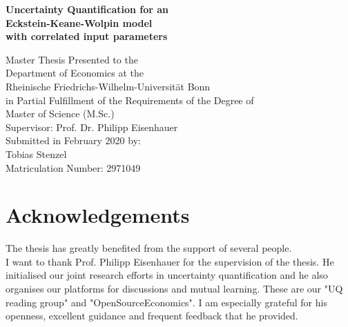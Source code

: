 \begin{titlepage}
	
\begin{center}
	
\vspace*{1.0cm}

{\LARGE
\bfseries Uncertainty Quantification for an \\
\vspace*{0.5cm}
Eckstein-Keane-Wolpin model
}
\\
\vspace*{0.5cm}
{\LARGE
\bfseries with correlated input parameters
}

{\large
\vspace*{4.0cm}
Master Thesis Presented to the\\
\vspace*{0.25cm}
Department of Economics at the\\
\vspace*{0.25cm}
Rheinische Friedrichs-Wilhelm-Universität Bonn\\

\vspace*{2.0cm}
in Partial Fulfillment of the Requirements of the Degree of\\
\vspace*{0.25cm}
Master of Science (M.Sc.)\\

\vspace*{4.0cm}
Supervisor: Prof. Dr. Philipp Eisenhauer\\

\vspace*{2.0cm}
Submitted in February 2020 by:\\
Tobias Stenzel\\
Matriculation Number: 2971049
}

\end{center}

\end{titlepage}

\newpage
\section*{Acknowledgements}

The thesis has greatly benefited from the support of several people.\\

\noindent
I want to thank Prof. Philipp Eisenhauer for the supervision of the thesis. He initialised our joint research efforts in uncertainty quantification and he also organises our platforms for discussions and mutual learning. These are our "UQ reading group" and "OpenSourceEconomics". I am especially grateful for his openness, excellent guidance and frequent feedback that he provided.\\

